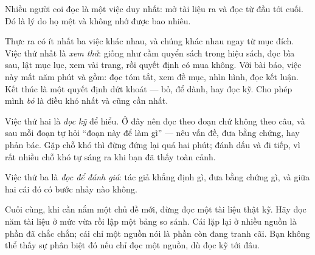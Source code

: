 \documentclass[../../english.tex]{subfiles}
\begin{document}
\begin{dongian}
Nhiều người coi đọc là một việc duy nhất: mở tài liệu ra và đọc từ đầu tới cuối. Đó là lý do họ mệt và không nhớ được bao nhiêu.

Thực ra có ít nhất ba việc khác nhau, và chúng khác nhau ngay từ mục đích. Việc thứ nhất là \emph{xem thử}: giống như cầm quyển sách trong hiệu sách, đọc bìa sau, lật mục lục, xem vài trang, rồi quyết định có mua không. Với bài báo, việc này mất năm phút và gồm: đọc tóm tắt, xem đề mục, nhìn hình, đọc kết luận. Kết thúc là một quyết định dứt khoát --- bỏ, để dành, hay đọc kỹ. Cho phép mình \emph{bỏ} là điều khó nhất và cũng cần nhất.

Việc thứ hai là \emph{đọc kỹ} để hiểu. Ở đây nên đọc theo đoạn chứ không theo câu, và sau mỗi đoạn tự hỏi ``đoạn này để làm gì'' --- nêu vấn đề, đưa bằng chứng, hay phản bác. Gặp chỗ khó thì đừng đứng lại quá hai phút; đánh dấu và đi tiếp, vì rất nhiều chỗ khó tự sáng ra khi bạn đã thấy toàn cảnh.

Việc thứ ba là \emph{đọc để đánh giá}: tác giả khẳng định gì, đưa bằng chứng gì, và giữa hai cái đó có bước nhảy nào không.

Cuối cùng, khi cần nắm một chủ đề mới, đừng đọc một tài liệu thật kỹ. Hãy đọc năm tài liệu ở mức vừa rồi lập một bảng so sánh. Cái lặp lại ở nhiều nguồn là phần đã chắc chắn; cái chỉ một nguồn nói là phần còn đang tranh cãi. Bạn không thể thấy sự phân biệt đó nếu chỉ đọc một nguồn, dù đọc kỹ tới đâu.
\end{dongian}
\end{document}

